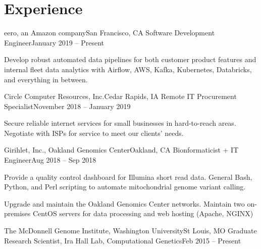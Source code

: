     \resumeSubHeadingListEnd

\section{Experience}
    \resumeSubHeadingListStart
    
    	    \resumeSubheading
	    {eero, an Amazon company}{San Francisco, CA}
	    {Software Development Engineer}{January 2019 -- Present}
	    
	    \resumeItemListStart
	    
		{Develop robust automated data pipelines for both customer product features and internal fleet data analytics with Airflow, AWS, Kafka, Kubernetes, Databricks, and everything in between.}
		
	\resumeItemListEnd
	
    	    \resumeSubheading
	    {Circle Computer Resources, Inc.}{Cedar Rapids, IA}
	    {Remote IT Procurement Specialist}{November 2018 -- January 2019}
	    
	    \resumeItemListStart
	    
		{Secure reliable internet services for small businesses in hard-to-reach areas. Negotiate with ISPs for service to meet our clients' needs.}
		
	\resumeItemListEnd
	
	    \resumeSubheading
	    {Girihlet, Inc., Oakland Genomics Center}{Oakland, CA}
	    {Bionformaticist + IT Engineer}{Aug 2018 -- Sep 2018}
	    
	    \resumeItemListStart
	    
	    	{Provide a quality control dashboard for Illumina short read data. General Bash, Python, and Perl scripting to automate mitochondrial genome variant calling.}
	    		
	    	{Upgrade and maintain the Oakland Genomics Center networks. Maintain two on-premises CentOS servers for data processing and web hosting (Apache, NGINX)}
		
	\resumeItemListEnd
     
        \resumeSubheading
        {The McDonnell Genome Institute, Washington University}{St Louis, MO}
        {Graduate Research Scientist, Ira Hall Lab, Computational Genetics}{Feb 2015 -- Present}

        \resumeItemListStart

